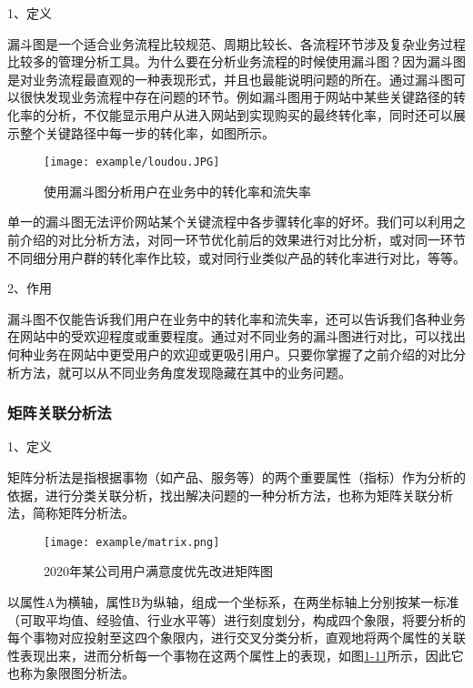 1、定义

漏斗图是一个适合业务流程比较规范、周期比较长、各流程环节涉及复杂业务过程比较多的管理分析工具。为什么要在分析业务流程的时候使用漏斗图？因为漏斗图是对业务流程最直观的一种表现形式，并且也最能说明问题的所在。通过漏斗图可以很快发现业务流程中存在问题的环节。例如漏斗图用于网站中某些关键路径的转化率的分析，不仅能显示用户从进入网站到实现购买的最终转化率，同时还可以展示整个关键路径中每一步的转化率，如图所示。

\begin{figure}[!htp]

\centering
\texttt{[image: example/loudou.JPG]}
\caption{使用漏斗图分析用户在业务中的转化率和流失率}
\label{figure:1-7}

\end{figure}

单一的漏斗图无法评价网站某个关键流程中各步骤转化率的好坏。我们可以利用之前介绍的对比分析方法，对同一环节优化前后的效果进行对比分析，或对同一环节不同细分用户群的转化率作比较，或对同行业类似产品的转化率进行对比，等等。

2、作用

漏斗图不仅能告诉我们用户在业务中的转化率和流失率，还可以告诉我们各种业务在网站中的受欢迎程度或重要程度。通过对不同业务的漏斗图进行对比，可以找出何种业务在网站中更受用户的欢迎或更吸引用户。只要你掌握了之前介绍的对比分析方法，就可以从不同业务角度发现隐藏在其中的业务问题。

\subsubsection{矩阵关联分析法}

1、定义

矩阵分析法是指根据事物（如产品、服务等）的两个重要属性（指标）作为分析的依据，进行分类关联分析，找出解决问题的一种分析方法，也称为矩阵关联分析法，简称矩阵分析法。

\begin{figure}[!htp]

\centering
\texttt{[image: example/matrix.png]}
\caption{2020年某公司用户满意度优先改进矩阵图}
\label{figure:1-11}

\end{figure}

以属性A为横轴，属性B为纵轴，组成一个坐标系，在两坐标轴上分别按某一标准（可取平均值、经验值、行业水平等）进行刻度划分，构成四个象限，将要分析的每个事物对应投射至这四个象限内，进行交叉分类分析，直观地将两个属性的关联性表现出来，进而分析每一个事物在这两个属性上的表现，如图\href{figure:1-11}{1-11}所示，因此它也称为象限图分析法。

